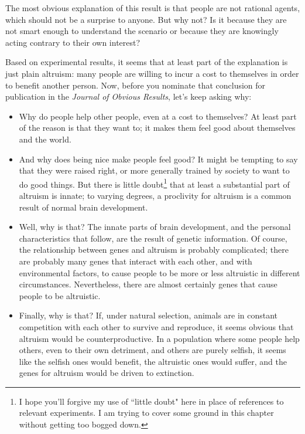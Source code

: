 \documentclass[12pt]{book}
\theoremstyle{exercise}
\begin{document}
The most obvious explanation of this result is that people are not rational agents, which should not be a surprise to anyone.  But why not?  Is it because they are not smart enough to understand the scenario or because they are knowingly acting contrary to their own interest?

Based on experimental results, it seems that at least part of the explanation is just plain altruism: many people are willing to incur a cost to themselves in order to benefit another person.  Now, before you nominate that conclusion for publication in the {\it Journal of Obvious Results}, let's keep asking why:

\begin{itemize}

\item Why do people help other people, even at a cost to themselves?  At least part of the reason is that they want to; it makes them feel good about themselves and the world.

\item And why does being nice make people feel good?  It might be tempting to say that they were raised right, or more generally trained by society to want to do good things.  But there is little doubt\footnote{I hope you'll forgive my use of ``little doubt" here in place of references to relevant experiments.  I am trying to cover some ground in this chapter without getting too bogged down.} that at least a substantial part of altruism is innate; to varying degrees, a proclivity for altruism is a common result of normal brain development.

\item Well, why is that?  The innate parts of brain development, and the personal characteristics that follow, are the result of genetic information.  Of course, the relationship between genes and altruism is probably complicated;  there are probably many genes that interact with each other, and with environmental factors, to cause people to be more or less altruistic in different circumstances.  Nevertheless, there are almost certainly genes that cause people to be altruistic.

\item Finally, why is that?  If, under natural selection, animals are in constant competition with each other to survive and reproduce, it seems obvious that altruism would be counterproductive.  In a population where some people help others, even to their own detriment, and others are purely selfish, it seems like the selfish ones would benefit, the altruistic ones would suffer, and the genes for altruism would be driven to extinction.

\end{itemize}
\end{document}
